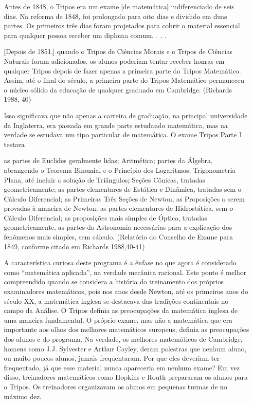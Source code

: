 \documentclass[a4paper,12pt]{article}[abntex2]
\begin{document}
Antes de 1848, o Tripos era um exame [de matemática] indiferenciado de seis dias. Na reforma de 1848, foi prolongado para oito dias e dividido em duas partes. Os primeiros três dias foram projetados para cobrir o material essencial para qualquer pessoa receber um diploma comum. . . .

[Depois de 1851,] quando o Tripos de Ciências Morais e o Tripos de Ciências Naturais foram adicionados, os alunos poderiam tentar receber honras em qualquer Tripos depois de fazer apenas a primeira parte do Tripos Matemático. Assim, até o final do século, a primeira parte do Tripos Matemático permaneceu o núcleo sólido da educação de qualquer graduado em Cambridge. (Richards 1988, 40)

Isso significava que não apenas a carreira de graduação, na principal universidade da Inglaterra, era passada em grande parte estudando matemática, mas na verdade se estudava um tipo particular de matemática. O exame Tripos Parte I testava

as partes de Euclides geralmente lidas; Aritmética; partes da Álgebra, abrangendo o Teorema Binomial e o Princípio dos Logaritmos; Trigonometria Plana, até incluir a solução de Triângulos; Seções Cônicas, tratadas geometricamente; as partes elementares de Estática e Dinâmica, tratadas sem o Cálculo Diferencial; as Primeiras Três Seções de Newton, as Proposições a serem provadas à maneira de Newton; as partes elementares de Hidrostática, sem o Cálculo Diferencial; as proposições mais simples de Óptica, tratadas geometricamente, as partes da Astronomia necessárias para a explicação dos fenômenos mais simples, sem cálculo. (Relatório do Conselho de Exame para 1849, conforme citado em Richards 1988,40-41)

A característica curiosa deste programa é a ênfase no que agora é considerado como “matemática aplicada”, na verdade mecânica racional. Este ponto é melhor compreendido quando se considera a história do treinamento dos próprios examinadores matemáticos, pois nos anos desde Newton, até os primeiros anos do século XX, a matemática inglesa se destacava das tradições continentais no campo da Análise. O Tripos definia as preocupações da matemática inglesa de uma maneira fundamental. O próprio exame, mas não a matemática que era importante aos olhos dos melhores matemáticos europeus, definia as preocupações dos alunos e do programa. Na verdade, os melhores matemáticos de Cambridge, homens como J.J. Sylvester e Arthur Cayley, deram palestras que nenhum aluno, ou muito poucos alunos, jamais frequentaram. Por que eles deveriam ter frequentado, já que esse material nunca apareceria em nenhum exame? Em vez disso, treinadores matemáticos como Hopkins e Routh prepararam os alunos para o Tripos. Os treinadores organizavam os alunos em pequenas turmas de no máximo dez.
\end{document}
